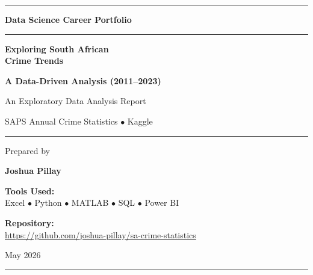 \documentclass[titlepage, 12pt, oneside]{article}
\numberwithin{equation}{section}
\begin{document}
	
	\begin{titlepage}
		\centering
		
	
		\textcolor[HTML]{2E7D32}{\rule{\linewidth}{4pt}}
		
		\vspace{1.5cm}
		
		{\Large \textbf{Data Science Career Portfolio}}
		
		\vspace{1.2cm}
		
		\textcolor[HTML]{2E7D32}{\rule{0.8\linewidth}{1pt}}
		
		\vspace{0.5cm}
		
		{\Huge \textbf{Exploring South African\\[0.3cm] Crime Trends}}
		
		\vspace{0.4cm}
		
		{\Large \textbf{\textcolor[HTML]{2E7D32}{A Data-Driven Analysis (2011--2023)}}}
		
		\vspace{0.5cm}
		
		{\large An Exploratory Data Analysis Report}
		
		\vspace{0.4cm}
		
		{\large SAPS Annual Crime Statistics $\bullet$ Kaggle}
		
		\vspace{0.5cm}
		
		
		\textcolor[HTML]{2E7D32}{\rule{0.8\linewidth}{1pt}}
		
		\vspace{1.2cm}
		
		{\large Prepared by}
		
		\vspace{0.3cm}
		
		{\Large \textbf{Joshua Pillay}}
		
		\vspace{0.8cm}
		
		{\large \textcolor[HTML]{2E7D32}{\textbf{Tools Used:}}}\\[0.03cm] 
		{\large Excel $\bullet$ Python $\bullet$ MATLAB $\bullet$ SQL $\bullet$ Power BI}
		
		\vspace{0.5cm}
		
		{\large \textcolor[HTML]{2E7D32}{\textbf{Repository:}}}\\[0.03cm] 
		{\large \url{https://github.com/joshua-pillay/sa-crime-statistics}}
		
		\vspace{0.6cm}
		
		{\large May 2026}
		
		\vspace{\fill}
		
	
		\textcolor[HTML]{2E7D32}{\rule{\linewidth}{4pt}}
		
	\end{titlepage}
	
\end{document}
